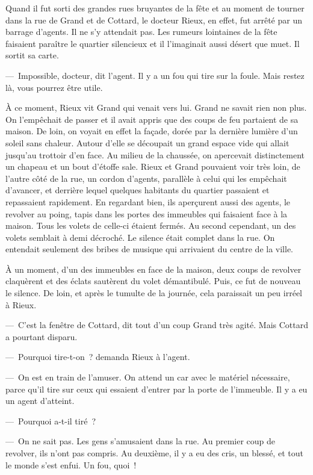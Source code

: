 \documentclass[french,twoside]{book} %
\begin{document}
Quand il fut sorti des grandes rues bruyantes de la fête et au moment de tourner dans la rue de Grand et de Cottard, le docteur Rieux, en effet, fut arrêté par un barrage d’agents. Il ne s’y attendait pas. Les rumeurs lointaines de la fête faisaient paraître le quartier silencieux et il l’imaginait aussi désert que muet. Il sortit sa carte.\par
— Impossible, docteur, dit l’agent. Il y a un fou qui tire sur la foule. Mais restez là, vous pourrez être utile.\par
À ce moment, Rieux vit Grand qui venait vers lui. Grand ne savait rien non plus. On l’empêchait de passer et il avait appris que des coups de feu partaient de sa maison. De loin, on voyait en effet la façade, dorée par la dernière lumière d’un soleil sans chaleur. Autour d’elle se découpait un grand espace vide qui allait jusqu’au trottoir d’en face. Au milieu de la chaussée, on apercevait distinctement un chapeau et un bout d’étoffe sale. Rieux et Grand pouvaient voir très loin, de l’autre côté de la rue, un cordon d’agents, parallèle à celui qui les empêchait d’avancer, et derrière lequel quelques habitants du quartier passaient et repassaient rapidement. En regardant bien, ils aperçurent aussi des agents, le revolver au poing, tapis dans les portes des immeubles qui faisaient face à la maison. Tous les volets de celle-ci étaient fermés. Au second cependant, un des volets semblait à demi décroché. Le silence était complet dans la rue. On entendait seulement des bribes de musique qui arrivaient du centre de la ville.\par
À un moment, d’un des immeubles en face de la maison, deux coups de revolver claquèrent et des éclats sautèrent du volet démantibulé. Puis, ce fut de nouveau le silence. De loin, et après le tumulte de la journée, cela paraissait un peu irréel à Rieux.\par
— C’est la fenêtre de Cottard, dit tout d’un coup Grand très agité. Mais Cottard a pourtant disparu.\par
— Pourquoi tire-t-on ? demanda Rieux à l’agent.\par
— On est en train de l’amuser. On attend un car avec le matériel nécessaire, parce qu’il tire sur ceux qui essaient d’entrer par la porte de l’immeuble. Il y a eu un agent d’atteint.\par
— Pourquoi a-t-il tiré ?\par
— On ne sait pas. Les gens s’amusaient dans la rue. Au premier coup de revolver, ils n’ont pas compris. Au deuxième, il y a eu des cris, un blessé, et tout le monde s’est enfui. Un fou, quoi !\par
\end{document}
